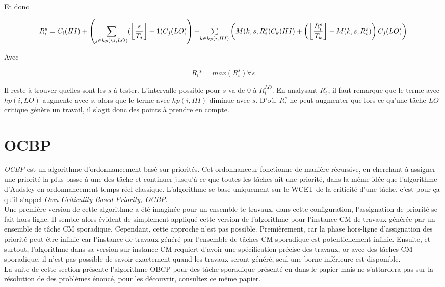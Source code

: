 \documentclass[12pt,a4paper,oneside]{book}
\theoremstyle{break}
\theoremstyle{breakplain}
\begin{document}
Et donc 

\begin{equation}
R_i^s = C_i(HI) + \left( \underset{j \in hp(\i, LO)}{\sum} (\left\lfloor \dfrac{s}{T_j} \right\rfloor + 1) C_j(LO) \right) +$$\\$$\underset{k \in hp(i, HI)}{\sum} \left( M(k,s,R_i^s)C_k(HI) + \left(\left\lfloor \dfrac{R_i^s}{T_k} \right\rfloor - M(k,s,R_i^s)\right) C_j(LO) \right)
\end{equation}

Avec

\begin{equation}
R_i* = max(R_i^s) \forall s
\end{equation}

Il reste à trouver quelles sont les $s$ à tester. L'intervalle possible pour $s$ va de $0$ à $R^{LO}_i$. En analysant $R_i^s$, il faut remarque que le terme avec $hp(i, LO)$ augmente avec $s$, alors que le terme avec $hp(i, HI)$ diminue avec $s$. D'où, $R_i^s$ ne peut augmenter que lors ce qu'une tâche $LO$-critique génère un travail, il s'agit donc des points à prendre en compte.


\section{OCBP}

\textit{OCBP} est un algorithme d'ordonnancement basé sur priorités. Cet ordonnanceur fonctionne de manière récursive, en cherchant à assigner une priorité la plus basse à une des tâche et continuer jusqu'à ce que toutes les tâches ait une priorité, dans la même idée que l'algorithme d'Audsley\cite{audsley1991optimal} en ordonnancement temps réel classique. L'algorithme se base uniquement sur le WCET de la criticité d'une tâche, c'est pour ça qu'il s'appel \textit{Own Criticality Based Priority, OCBP}.\\
Une première version de cette algorithme a été imaginée pour un ensemble te travaux, dans cette configuration, l'assignation de priorité se fait hors ligne.\cite{baruah2010towards} Il semble alors évident de simplement appliqué cette version de l'algorithme pour l'instance CM de travaux générée par un ensemble de tâche CM sporadique. Cependant, cette approche n'est pas possible. Premièrement, car la phase hors-ligne d'assignation des priorité peut être infinie car l'instance de travaux généré par l'ensemble de tâches CM sporadique est potentiellement infinie. Ensuite, et surtout, l'algorithme dans sa version sur instance CM requiert d'avoir une spécification précise des travaux, or avec des tâches CM sporadique, il n'est pas possible de savoir exactement quand les travaux seront généré, seul une borne inférieure est disponible.\\
La suite de cette section présente l'algorithme OBCP pour des tâche sporadique présenté en dans le papier \cite{li2010algorithm} mais ne s'attardera pas sur la résolution de des problèmes énoncé, pour les découvrir, consultez ce même papier.\\
\end{document}

